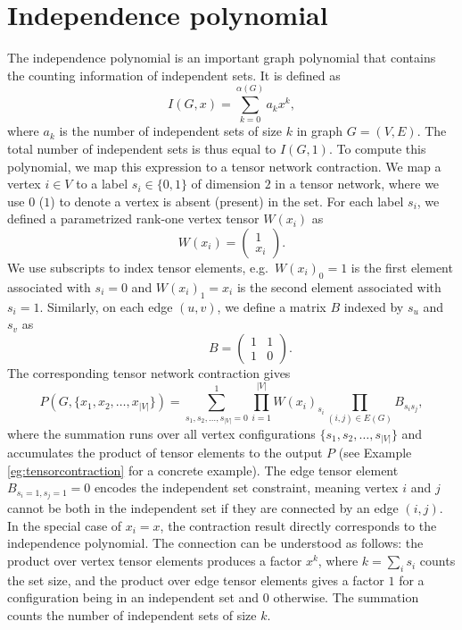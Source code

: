 \documentclass[onefignum, onetabnum]{siamart190516}
\newcommand{\<}{\langle}
\renewcommand{\>}{\rangle}
\newcounter{example}
\begin{document}
\section{Independence polynomial} \label{sec:indpoly}
The independence polynomial is an important graph polynomial that contains the counting information of independent sets. It is defined as
\begin{equation}\label{eq:idpdef}
I(G, x) = \sum_{k=0}^{\alpha(G)} a_k x^k,
\end{equation}
where $a_k$ is the number of independent sets of size $k$ in graph $G=(V,E)$. The total number of independent sets is thus equal to $I(G, 1)$.
To compute this polynomial, we map this expression to a tensor network contraction.
We map a vertex $i\in V$ to a label $s_i \in \{0, 1\}$ of dimension $2$ in a tensor network, where we use $0$ ($1$) to denote a vertex is absent (present) in the set.
For each label $s_i$, we defined a parametrized rank-one vertex tensor $W(x_i)$ as
\begin{equation}
    W(x_i) = \left(\begin{matrix}
        1 \\
        x_i
    \end{matrix}\right).
\end{equation}
We use subscripts to index tensor elements, e.g.\ $W(x_i)_0=1$ is the first element associated with $s_i=0$ and $W(x_i)_1=x_i$ is the second element associated with $s_i=1$.
Similarly, on each edge $(u, v)$, we define a matrix $B$ indexed by $s_u$ and $s_v$ as
\begin{equation}
    \qquad \quad 
       B = \left(\begin{matrix}
        1  & 1\\
        1 & 0
    \end{matrix}\right). \label{eq:edgetensor}
\end{equation}
The corresponding tensor network contraction gives
\begin{equation}\label{eq:idp}
    P(G, \{x_1, x_{2}, \ldots,x_{|V|}\}) = \sum\limits_{s_1, s_2, \ldots, s_{|V|} = 0}^{1} \prod\limits_{i=1}^{|V|} W(x_i)_{s_i} \prod\limits_{(i,j) \in E(G)} B_{s_i s_j},
\end{equation}
where the summation runs over all vertex configurations $\{s_1, s_{2}, \ldots,s_{|V|}\}$ and accumulates the product of tensor elements to the output $P$ (see Example \ref{eg:tensorcontraction} for a concrete example).
The edge tensor element $B_{s_{i}=1, s_{j}=1} = 0$ encodes the independent set constraint, meaning vertex $i$ and $j$ cannot be both in the independent set if they are connected by an edge $(i,j)$.
In the special case of $x_i = x$, the contraction result directly corresponds to the independence polynomial.
The connection can be understood as follows: the product over vertex tensor elements produces a factor $x^k$, where $k=\sum_i s_i$ counts the set size,
and the product over edge tensor elements gives a factor $1$ for a configuration being in an independent set and $0$ otherwise. The summation counts the number of independent sets of size $k$. 
\end{document}
